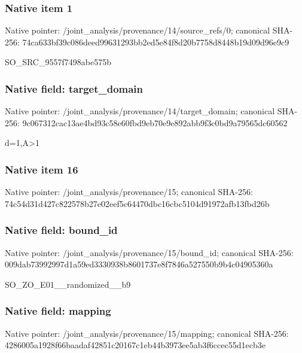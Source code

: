 \documentclass[10pt,a4paper]{article}
\begin{document}
\subsubsection{Native item 1}
Native pointer: /joint\_\allowbreak{}analysis/provenance/14/source\_\allowbreak{}refs/0; canonical SHA-256: 74ca633bf39c086deed99631293bb2ed5e84f8d20b7758d8448b19d09d96e9c9

\begingroup\raggedright\sloppy SO\_\allowbreak{}SRC\_\allowbreak{}9557f7498abe575b\par\endgroup

\subsubsection{Native field: target\_\allowbreak{}domain}
Native pointer: /joint\_\allowbreak{}analysis/provenance/14/target\_\allowbreak{}domain; canonical SHA-256: 9c067312cac13ae4bd93c58e60fbd9eb70e9e892abb9f3c0bd9a79565dc60562

\begingroup\raggedright\sloppy d=\allowbreak{}1,\allowbreak{}A>1\par\endgroup

\subsubsection{Native item 16}
Native pointer: /joint\_\allowbreak{}analysis/provenance/15; canonical SHA-256: 74c54d31d427c822578b27e02eef5c64470dbc16cbc5104d91972afb13fbd26b

\subsubsection{Native field: bound\_\allowbreak{}id}
Native pointer: /joint\_\allowbreak{}analysis/provenance/15/bound\_\allowbreak{}id; canonical SHA-256: 009dab73992997d1a59ed3330938b8601737e8f7846a527550b9b4c04905360a

\begingroup\raggedright\sloppy SO\_\allowbreak{}ZO\_\allowbreak{}E01\_\allowbreak{}\_\allowbreak{}randomized\_\allowbreak{}\_\allowbreak{}b9\par\endgroup

\subsubsection{Native field: mapping}
Native pointer: /joint\_\allowbreak{}analysis/provenance/15/mapping; canonical SHA-256: 4286005a1928f66baadaf42851c20167c1eb44b3973ee5ab3f6ccec55d1ecb3e
\end{document}
